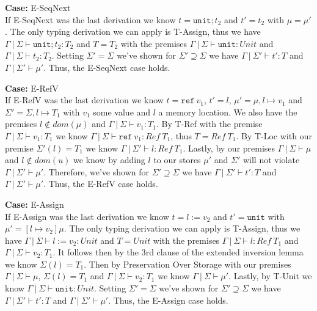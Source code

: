 \documentclass[12pt, fleqn]{article}
\begin{document}
\medskip
\textbf{Case:} E-SeqNext\\
If E-SeqNext was the last derivation we know $t = \texttt{unit} ; t_2$ and $t' = t_2$ with $\mu = \mu'$. The only typing derivation we can apply is T-Assign, thus we have $\Gamma\:|\:\Sigma \vdash \texttt{unit} ; t_2 : T_2$ and $T = T_2$ with the premises $\Gamma\:|\:\Sigma \vdash \texttt{unit} : Unit$ and $\Gamma\:|\:\Sigma \vdash t_2 : T_2$. 
Setting $\Sigma' = \Sigma$ we've shown for $\Sigma' \supseteq \Sigma$ we have $\Gamma\:|\:\Sigma' \vdash t' : T$ and $\Gamma\:|\:\Sigma' \vdash \mu'$. Thus, the E-SeqNext case holds.

\medskip
\textbf{Case:} E-RefV\\
If E-RefV was the last derivation we know $t = \texttt{ref}\:v_1$, $t' = l$, $\mu' = \mu, l \mapsto v_1$ and $\Sigma' = \Sigma, l \mapsto T_1$ with $v_1$ some value and $l$ a memory location. We also have the premises $l \notin dom(\mu)$ and $\Gamma\:|\:\Sigma \vdash v_1 : T_1$. By T-Ref with the premise $\Gamma\:|\:\Sigma \vdash v_1 : T_1$ we know $\Gamma\:|\:\Sigma \vdash \texttt{ref}\:v_1 : Ref \: T_1$, thus $T = Ref\:T_1$. 
By T-Loc with our premise $\Sigma'(l) = T_1$ we know $\Gamma\:|\:\Sigma' \vdash l : Ref\:T_1$. Lastly, by our premises $\Gamma\:|\:\Sigma \vdash \mu$ and $l \notin dom(u)$ we know by adding $l$ to our stores $\mu'$ and $\Sigma'$ will not violate $\Gamma\:|\:\Sigma' \vdash \mu'$. Therefore, we've shown for $\Sigma' \supseteq \Sigma$ we have  $\Gamma\:|\:\Sigma' \vdash t' : T$ and $\Gamma\:|\:\Sigma' \vdash \mu'$. Thus, the E-RefV case holds.

\medskip
\textbf{Case:} E-Assign\\
If E-Assign was the last derivation we know $t = l := v_2$ and $t' = \texttt{unit}$ with $\mu' = [l \mapsto v_2]\mu$. The only typing derivation we can apply is T-Assign, thus we have $\Gamma\:|\:\Sigma \vdash l := v_2 : Unit$ and $T = Unit$ with the premises $\Gamma\:|\:\Sigma \vdash l : Ref\:T_1$ and $\Gamma\:|\:\Sigma \vdash v_2 : T_1$. It follows then by the 3rd clause of the extended inversion lemma we know $\Sigma(l) = T_1$.
Then by Preservation Over Storage with our premises $\Gamma\:|\:\Sigma \vdash \mu$, $\Sigma(l) = T_1$ and $\Gamma\:|\:\Sigma \vdash v_2 : T_1$ we know $\Gamma\:|\:\Sigma \vdash \mu'$. Lastly, by T-Unit we know $\Gamma\:|\:\Sigma \vdash \texttt{unit} : Unit$. Setting $\Sigma' = \Sigma$ we've shown for $\Sigma' \supseteq \Sigma$ we have $\Gamma\:|\:\Sigma' \vdash t' : T$ and $\Gamma\:|\:\Sigma' \vdash \mu'$. Thus, the E-Assign case holds.
\end{document}
